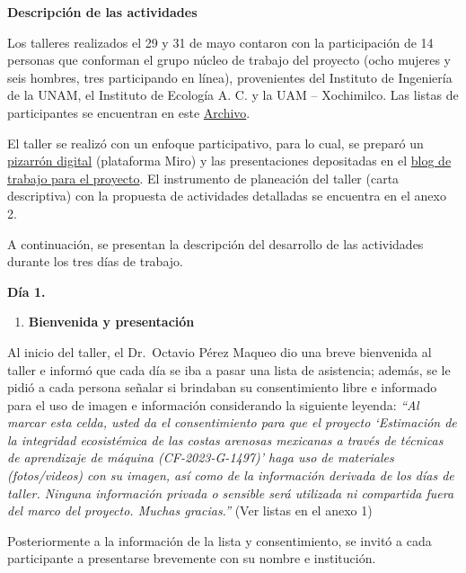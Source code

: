 \documentclass[
  letterpaper,
  DIV=11,
  numbers=noendperiod]{scrreprt}
\providecommand{\tightlist}{%
  \setlength{\itemsep}{0pt}\setlength{\parskip}{0pt}}\usepackage{longtable,booktabs,array}
\begin{document}
\textbf{Descripción de las actividades}

Los talleres realizados el 29 y 31 de mayo contaron con la participación
de 14 personas que conforman el grupo núcleo de trabajo del proyecto
(ocho mujeres y seis hombres, tres participando en línea), provenientes
del Instituto de Ingeniería de la UNAM, el Instituto de Ecología A. C. y
la UAM -- Xochimilco. Las listas de participantes se encuentran en este
\href{Taller/Anexo\%201\%20Lista\%20de\%20participantes.pdf}{Archivo}.

El taller se realizó con un enfoque participativo, para lo cual, se
preparó un
\href{https://miro.com/welcomeonboard/ckhlZ3lXY1djM0FXd3ZIZmlpV3FUVXFONGJsUFJ0NGFIaWw0eGdHOHBDalhDdFk1Zjg1MUVOZTNMUmZaNDhPVHwzMDc0NDU3MzUyMDM4MTIwMjcwfDI=?share_link_id=865983900620}{pizarrón
digital} (plataforma Miro) y las presentaciones depositadas en el
\href{https://sw-costas-arenosas.netlify.app/presentaciones\#category=presentaci\%C3\%B3n}{blog
de trabajo para el proyecto}. El instrumento de planeación del taller
(carta descriptiva) con la propuesta de actividades detalladas se
encuentra en el anexo 2.

A continuación, se presentan la descripción del desarrollo de las
actividades durante los tres días de trabajo.

\textbf{Día 1.}

\begin{enumerate}
\def\labelenumi{\arabic{enumi}.}
\tightlist
\item
  \textbf{Bienvenida y presentación}
\end{enumerate}

Al inicio del taller, el Dr.~Octavio Pérez Maqueo dio una breve
bienvenida al taller e informó que cada día se iba a pasar una lista de
asistencia; además, se le pidió a cada persona señalar si brindaban su
consentimiento libre e informado para el uso de imagen e información
considerando la siguiente leyenda: \emph{``Al marcar esta celda, usted
da el consentimiento para que el proyecto `Estimación de la integridad
ecosistémica de las costas arenosas mexicanas a través de técnicas de
aprendizaje de máquina (CF-2023-G-1497)' haga uso de materiales
(fotos/videos) con su imagen, así como de la información derivada de los
días de taller. Ninguna información privada o sensible será utilizada ni
compartida fuera del marco del proyecto. Muchas gracias.''} (Ver listas
en el anexo 1)

Posteriormente a la información de la lista y consentimiento, se invitó
a cada participante a presentarse brevemente con su nombre e
institución.
\end{document}
